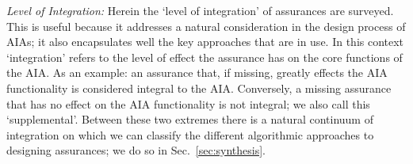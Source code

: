 \emph{Level of Integration:} Herein the `level of integration' of assurances are surveyed. This is useful because it addresses a natural consideration in the design process of AIAs; it also encapsulates well the key approaches that are in use. In this context `integration' refers to the level of effect the assurance has on the core functions of the AIA. As an example: an assurance that, if missing, greatly effects the AIA functionality is considered integral to the AIA. Conversely, a missing assurance that has no effect on the AIA functionality is not integral; we also call this `supplemental'. Between these two extremes there is a natural continuum of integration on which we can classify the different algorithmic approaches to designing assurances; we do so in Sec.~\ref{sec:synthesis}.
